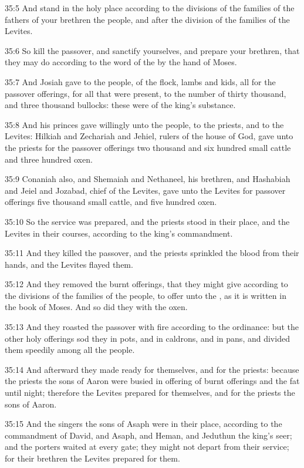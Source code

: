 35:5 And stand in the holy place according to the divisions of the families of the fathers of your brethren the people, and after the division of the families of the Levites.

35:6 So kill the passover, and sanctify yourselves, and prepare your brethren, that they may do according to the word of the \LORD by the hand of Moses.

35:7 And Josiah gave to the people, of the flock, lambs and kids, all for the passover offerings, for all that were present, to the number of thirty thousand, and three thousand bullocks: these were of the king's substance.

35:8 And his princes gave willingly unto the people, to the priests, and to the Levites: Hilkiah and Zechariah and Jehiel, rulers of the house of God, gave unto the priests for the passover offerings two thousand and six hundred small cattle and three hundred oxen.

35:9 Conaniah also, and Shemaiah and Nethaneel, his brethren, and Hashabiah and Jeiel and Jozabad, chief of the Levites, gave unto the Levites for passover offerings five thousand small cattle, and five hundred oxen.

35:10 So the service was prepared, and the priests stood in their place, and the Levites in their courses, according to the king's commandment.

35:11 And they killed the passover, and the priests sprinkled the blood from their hands, and the Levites flayed them.

35:12 And they removed the burnt offerings, that they might give according to the divisions of the families of the people, to offer unto the \LORD, as it is written in the book of Moses. And so did they with the oxen.

35:13 And they roasted the passover with fire according to the ordinance: but the other holy offerings sod they in pots, and in caldrons, and in pans, and divided them speedily among all the people.

35:14 And afterward they made ready for themselves, and for the priests: because the priests the sons of Aaron were busied in offering of burnt offerings and the fat until night; therefore the Levites prepared for themselves, and for the priests the sons of Aaron.

35:15 And the singers the sons of Asaph were in their place, according to the commandment of David, and Asaph, and Heman, and Jeduthun the king's seer; and the porters waited at every gate; they might not depart from their service; for their brethren the Levites prepared for them.


